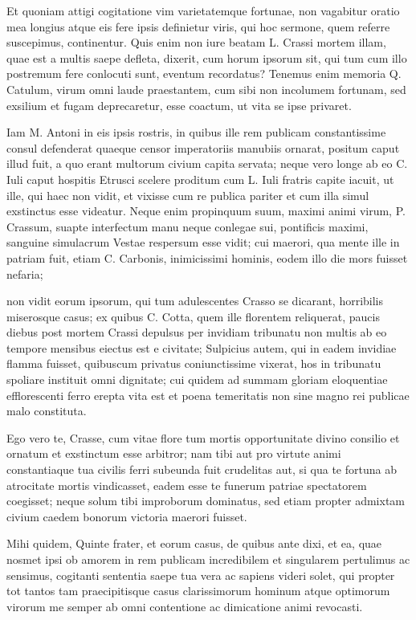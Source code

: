  Et quoniam attigi cogitatione vim varietatemque fortunae, non vagabitur oratio mea longius atque eis fere ipsis definietur viris, qui hoc sermone, quem referre suscepimus, continentur. Quis enim non iure beatam L. Crassi mortem illam, quae est a multis saepe defleta, dixerit, cum horum ipsorum sit, qui tum cum illo postremum fere conlocuti sunt, eventum recordatus? Tenemus enim memoria Q. Catulum, virum omni laude praestantem, cum sibi non incolumem fortunam, sed exsilium et fugam deprecaretur, esse coactum, ut vita se ipse privaret.

 Iam M. Antoni in eis ipsis rostris, in quibus ille rem publicam constantissime consul defenderat quaeque censor imperatoriis manubiis ornarat, positum caput illud fuit, a quo erant multorum civium capita servata; neque vero longe ab eo C. Iuli caput hospitis Etrusci scelere proditum cum L. Iuli fratris capite iacuit, ut ille, qui haec non vidit, et vixisse cum re publica pariter et cum illa simul exstinctus esse videatur. Neque enim propinquum suum, maximi animi virum, P. Crassum, suapte interfectum manu neque conlegae sui, pontificis maximi, sanguine simulacrum Vestae respersum esse vidit; cui maerori, qua mente ille in patriam fuit, etiam C. Carbonis, inimicissimi hominis, eodem illo die mors fuisset nefaria;

 non vidit eorum ipsorum, qui tum adulescentes Crasso se dicarant, horribilis miserosque casus; ex quibus C. Cotta, quem ille florentem reliquerat, paucis diebus post mortem Crassi depulsus per invidiam tribunatu non multis ab eo tempore mensibus eiectus est e civitate; Sulpicius autem, qui in eadem invidiae flamma fuisset, quibuscum privatus coniunctissime vixerat, hos in tribunatu spoliare instituit omni dignitate; cui quidem ad summam gloriam eloquentiae efflorescenti ferro erepta vita est et poena temeritatis non sine magno rei publicae malo constituta.

 Ego vero te, Crasse, cum vitae flore tum mortis opportunitate divino consilio et ornatum et exstinctum esse arbitror; nam tibi aut pro virtute animi constantiaque tua civilis ferri subeunda fuit crudelitas aut, si qua te fortuna ab atrocitate mortis vindicasset, eadem esse te funerum patriae spectatorem coegisset; neque solum tibi improborum dominatus, sed etiam propter admixtam civium caedem bonorum victoria maerori fuisset.

 Mihi quidem, Quinte frater, et eorum casus, de quibus ante dixi, et ea, quae nosmet ipsi ob amorem in rem publicam incredibilem et singularem pertulimus ac sensimus, cogitanti sententia saepe tua vera ac sapiens videri solet, qui propter tot tantos tam praecipitisque casus clarissimorum hominum atque optimorum virorum me semper ab omni contentione ac dimicatione animi revocasti.

